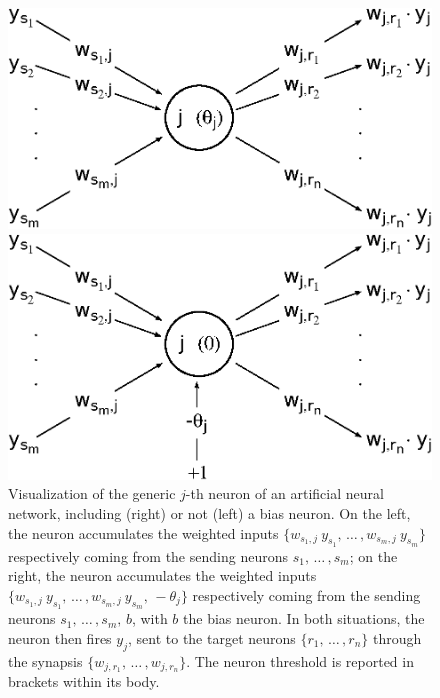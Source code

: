 \documentclass{elsarticle}
\numberwithin{equation}{section}
\theoremstyle{theorem}
\theoremstyle{definition}
\theoremstyle{remark}
\theoremstyle{proposition}
\numberwithin{figure}{section}
\begin{document}
		\begin{figure}[t]
			\begin{minipage}{0.49\textwidth}
				\center
				\vspace*{-0.35cm}
				\includegraphics[scale = 0.55]{neural_model_ter.eps}
			\end{minipage}
			\begin{minipage}{0.49\textwidth}
				\center
				\includegraphics[scale = 0.55]{neural_model_bias.eps}
			\end{minipage}
			
			\caption{Visualization of the generic $j$-th neuron of an artificial neural network, including (right) or not (left) a bias neuron. On the left, the neuron accumulates the weighted inputs $\big\lbrace w_{s_1,j} ~ y_{s_1}, \, \ldots \, , w_{s_m,j} ~ y_{s_m} \big\rbrace$ respectively coming from the sending neurons $s_1, \, \ldots \, , s_m$; on the right, the neuron accumulates the weighted inputs $\big\lbrace w_{s_1,j} ~ y_{s_1}, \, \ldots \, , w_{s_m,j} ~ y_{s_m}, \, -\theta_j \big\rbrace$ respectively coming from the sending neurons $s_1, \, \ldots \, , s_m, \, b$, with $b$ the bias neuron. In both situations, the neuron then fires $y_j$, sent to the target neurons $\big\lbrace r_1, \, \ldots \, , r_n \big\rbrace$ through the synapsis $\big\lbrace w_{j,r_1}, \, \ldots \, , w_{j,r_n} \big\rbrace$. The neuron threshold is reported in brackets within its body.} 
			\label{fig:neural-model}
		\end{figure}
		
\end{document}
